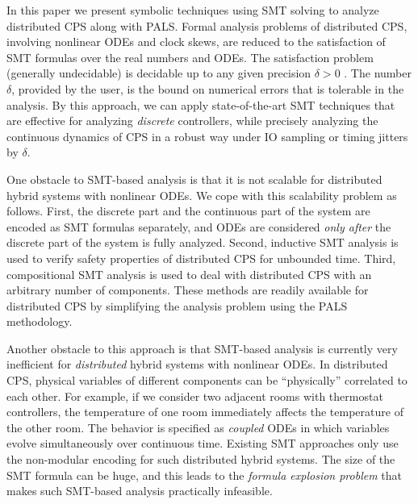 In this paper we present symbolic techniques using SMT solving to analyze 
distributed CPS along with PALS.
Formal analysis problems of distributed CPS, 
involving nonlinear ODEs and clock skews, 
are reduced to the satisfaction of SMT formulas over the real numbers and ODEs.
%
The satisfaction problem
(generally undecidable)
 is decidable up to any given precision $\delta > 0$ \cite{delta-comp,sat-ode}.
The number $\delta$, provided by the user, 
is the bound on numerical errors that is tolerable in the analysis.
By this approach, 
we can apply state-of-the-art SMT techniques that are %
effective for analyzing \emph{discrete} controllers,
while precisely analyzing
the continuous dynamics of CPS
in a robust way under IO sampling or timing jitters %
by $\delta$.


One obstacle to SMT-based analysis is 
that it is not scalable for distributed hybrid systems with nonlinear ODEs.
We cope with this scalability problem as follows.
First, the discrete part and the continuous part of the system are encoded as SMT formulas separately, 
and ODEs are considered \emph{only after} the discrete part of the system is fully analyzed.
Second, inductive SMT analysis is used to verify safety properties of distributed CPS for unbounded time.
Third, compositional SMT analysis is used to deal with distributed CPS with an arbitrary number of components. 
These methods are readily available for distributed CPS by simplifying the analysis problem using the PALS methodology. 




Another  obstacle to this approach is that 
SMT-based analysis 
is currently very inefficient
for \emph{distributed} hybrid systems with nonlinear ODEs. %
In distributed CPS, 
physical variables of different components can be ``physically'' correlated to each other.
For example, if we consider two adjacent rooms with thermostat controllers, the temperature of one room immediately affects the temperature of the other room. %
The behavior is specified as \emph{coupled} ODEs
in which variables evolve simultaneously over continuous time.
Existing SMT approaches only use the non-modular encoding
for such distributed hybrid systems. 
%
The size of the SMT formula can be huge,
and  this leads to the \emph{formula explosion problem}
that makes such SMT-based analysis practically infeasible.


